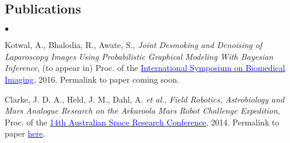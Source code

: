 \documentclass[margin,line]{res}
\newenvironment{list2}{
  \begin{list}{$\bullet$}{%
      \setlength{\itemsep}{0in}
      \setlength{\parsep}{0in} \setlength{\parskip}{0in}
      \setlength{\topsep}{0in} \setlength{\partopsep}{0in} 
      \setlength{\leftmargin}{0.2in}}}{\end{list}}
\begin{document}
\begin{resume}
\section{\sc Publications}
\begin{list2}
\item Kotwal, A., Bhalodia, R., Awate, S., {\em Joint Desmoking and Denoising of Laparoscopy Images Using Probabilistic Graphical Modeling With Bayesian Inference}, (to appear in) Proc. of the \href{http://biomedicalimaging.org/2016/}{\textcolor{blue} {International Symposium on Biomedical Imaging}}, 2016. Permalink to paper coming soon. %
\item Clarke, J. D. A., Held, J. M., Dahl, A. {\em et al.}, {\em Field Robotics, Astrobiology and Mars Analogue Research on the Arkaroola Mars Robot Challenge Expedition}, Proc. of the \href{http://www.nssa.com.au/14asrc/14ASRC-proceedings.zip}{\textcolor{blue} {14th Australian Space Research Conference}}, 2014. Permalink to paper \href{http://alankarkotwal.github.io/pubs/Arkaroola.pdf}{\textcolor{blue} {here}}.
\end{list2}


\end{resume}
\end{document}
